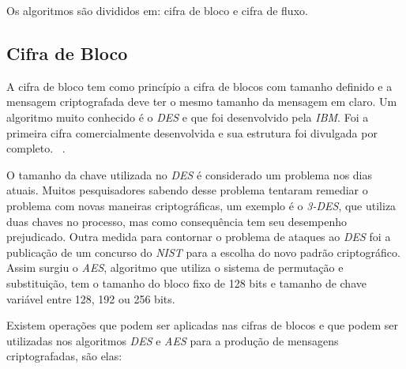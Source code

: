 Os algoritmos são divididos em: cifra de bloco e cifra de fluxo.

\subsection{Cifra de Bloco}
\label{block-cipher}

A cifra de bloco tem como princípio a cifra de blocos com tamanho definido e a mensagem criptografada deve ter o mesmo tamanho da mensagem em claro. Um algoritmo muito conhecido é o \textit{DES} e que foi desenvolvido pela \textit{IBM}. Foi a primeira cifra comercialmente desenvolvida e sua estrutura foi divulgada por completo. ~\cite{alex-biryukov}. 

O tamanho da chave utilizada no \textit{DES} é considerado um problema nos dias atuais. Muitos pesquisadores sabendo desse problema tentaram remediar o problema com novas maneiras criptográficas, um exemplo é o \textit{3-DES}, que utiliza duas chaves no processo, mas como consequência tem seu desempenho prejudicado. Outra medida para contornar o problema de ataques ao \textit{DES} foi a publicação de um concurso do \textit{NIST} para a escolha do novo padrão criptográfico. Assim surgiu o \textit{AES}, algoritmo que utiliza o sistema de permutação e substituição, tem o tamanho do bloco fixo de 128 bits e tamanho de chave variável entre 128, 192 ou 256 bits. 

Existem operações que podem ser aplicadas nas cifras de blocos e que podem ser utilizadas nos algoritmos \textit{DES} e \textit{AES} para a produção de mensagens criptografadas, são elas:

